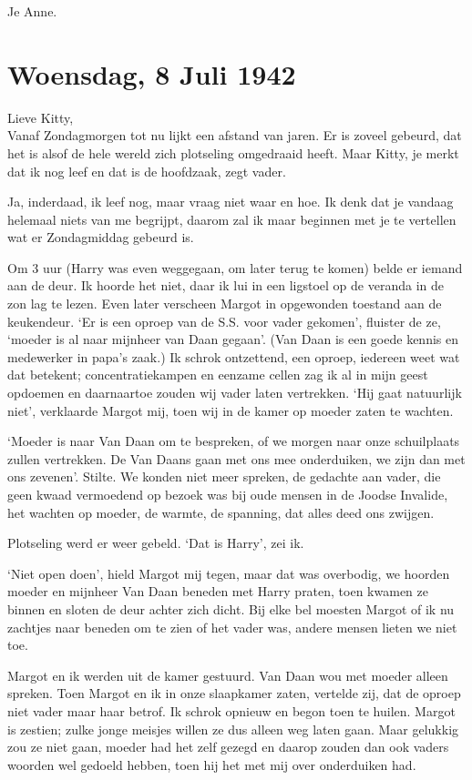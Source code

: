 \documentclass{book}
\begin{document}
Je Anne.

\section*{Woensdag, 8 Juli 1942}

Lieve Kitty,\\
Vanaf Zondagmorgen tot nu lijkt een afstand van jaren. Er is
zoveel gebeurd, dat het is alsof de hele wereld zich plotseling omgedraaid
heeft. Maar Kitty, je merkt dat ik nog leef en dat is de hoofdzaak, zegt vader.

Ja, inderdaad, ik leef nog, maar vraag niet waar en hoe. Ik denk dat je vandaag
helemaal niets van me begrijpt, daarom zal ik maar beginnen met je te vertellen
wat er Zondagmiddag gebeurd is.

Om 3 uur (Harry was even weggegaan, om later terug te komen) belde er iemand aan
de deur. Ik hoorde het niet, daar ik lui in een ligstoel op de veranda in de zon
lag te lezen. Even later verscheen Margot in opgewonden toestand aan de
keukendeur. `Er is een oproep van de S.S.  voor vader gekomen', fluister de ze,
`moeder is al naar mijnheer van Daan gegaan'. (Van Daan is een goede kennis en
medewerker in papa's zaak.) Ik schrok ontzettend, een oproep, iedereen weet wat
dat betekent; concentratiekampen en eenzame cellen zag ik al in mijn geest
opdoemen en daarnaartoe zouden wij vader laten vertrekken. `Hij gaat natuurlijk
niet', verklaarde Margot mij, toen wij in de kamer op moeder zaten te wachten.

`Moeder is naar Van Daan om te bespreken, of we morgen naar onze schuilplaats
zullen vertrekken. De Van Daans gaan met ons mee onderduiken, we zijn dan met
ons zevenen'. Stilte. We konden niet meer spreken, de gedachte aan vader, die
geen kwaad vermoedend op bezoek was bij oude mensen in de Joodse Invalide, het
wachten op moeder, de warmte, de spanning, dat alles deed ons zwijgen.

Plotseling werd er weer gebeld. `Dat is Harry', zei ik.

`Niet open doen', hield Margot mij tegen, maar dat was overbodig, we hoorden
moeder en mijnheer Van Daan beneden met Harry praten, toen kwamen ze binnen en
sloten de deur achter zich dicht. Bij elke bel moesten Margot of ik nu zachtjes
naar beneden om te zien of het vader was, andere mensen lieten we niet toe.

Margot en ik werden uit de kamer gestuurd. Van Daan wou met moeder alleen
spreken. Toen Margot en ik in onze slaapkamer zaten, vertelde zij, dat de oproep
niet vader maar haar betrof. Ik schrok opnieuw en begon toen te huilen. Margot
is zestien; zulke jonge meisjes willen ze dus alleen weg laten gaan. Maar
gelukkig zou ze niet gaan, moeder had het zelf gezegd en daarop zouden dan ook
vaders woorden wel gedoeld hebben, toen hij het met mij over onderduiken had.
\end{document}
